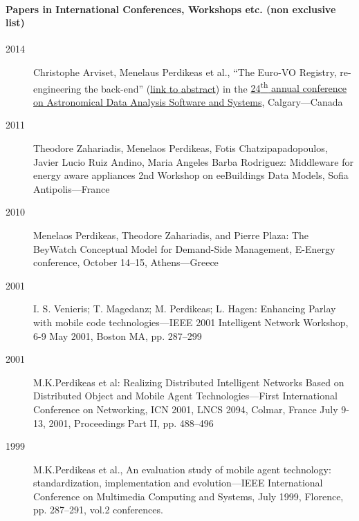 \documentclass[10pt,a4paper]{article} %
\begin{document}
\paragraph{Papers in International Conferences, Workshops etc. (non exclusive list)}
\begin{description}
\item[2014] Christophe Arviset, Menelaus Perdikeas et al., ``The Euro-VO Registry, re-engineering the back-end'' (\href{http://adsabs.harvard.edu/abs/2015ASPC..495..457A}{link to abstract}) in the \href{http://www.adass2014.org/announcements_en.php}{24\textsuperscript{th} annual conference on Astronomical Data Analysis Software and Systems}, Calgary---Canada
\item[2011] Theodore Zahariadis, Menelaos Perdikeas, Fotis Chatzipapadopoulos, Javier Lucio Ruiz Andino,
  Maria Angeles Barba Rodriguez: Middleware for energy aware appliances
  2nd Workshop on eeBuildings Data Models, Sofia Antipolis---France
\item[2010] Menelaos Perdikeas, Theodore Zahariadis, and Pierre Plaza: The BeyWatch Conceptual Model for Demand-Side Management, E-Energy conference, October 14--15, Athens---Greece
\item[2001] I. S. Venieris; T. Magedanz; M. Perdikeas; L. Hagen: Enhancing Parlay with mobile code technologies---IEEE 2001 Intelligent Network Workshop, 6-9 May 2001, Boston MA, pp. 287--299
\item[2001] M.K.Perdikeas et al: Realizing Distributed Intelligent Networks Based on Distributed Object and Mobile Agent Technologies---First International Conference on Networking, ICN 2001, LNCS 2094, Colmar, France July 9-13, 2001, Proceedings Part II, pp. 488--496
\item[1999] M.K.Perdikeas et al., An evaluation study of mobile agent technology: standardization, implementation and evolution---IEEE International Conference on Multimedia Computing and Systems, July 1999, Florence, pp. 287--291, vol.2
  conferences.
  
\end{description}
\end{document}
